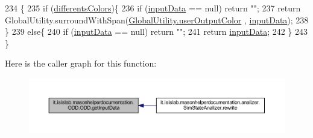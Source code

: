 \begin{DoxyCode}
234                                        \{
235         \textcolor{keywordflow}{if} (\hyperlink{classit_1_1isislab_1_1masonhelperdocumentation_1_1_o_d_d_1_1_o_d_d_ab09b176537cd5e168d67fc16112444dc}{differentsColors})\{
236             \textcolor{keywordflow}{if} (\hyperlink{classit_1_1isislab_1_1masonhelperdocumentation_1_1_o_d_d_1_1_o_d_d_a003e2cc245212d81de91896a8ce4f440}{inputData} == null) \textcolor{keywordflow}{return} \textcolor{stringliteral}{""};
237             \textcolor{keywordflow}{return} GlobalUtility.surroundWithSpan(\hyperlink{classit_1_1isislab_1_1masonhelperdocumentation_1_1analizer_1_1_global_utility_aec864cd710b27ece609c5a6093211ff4}{GlobalUtility.userOutputColor}
      , \hyperlink{classit_1_1isislab_1_1masonhelperdocumentation_1_1_o_d_d_1_1_o_d_d_a003e2cc245212d81de91896a8ce4f440}{inputData});
238         \}
239         \textcolor{keywordflow}{else}\{
240             \textcolor{keywordflow}{if} (\hyperlink{classit_1_1isislab_1_1masonhelperdocumentation_1_1_o_d_d_1_1_o_d_d_a003e2cc245212d81de91896a8ce4f440}{inputData} == null) \textcolor{keywordflow}{return} \textcolor{stringliteral}{""};
241             \textcolor{keywordflow}{return} \hyperlink{classit_1_1isislab_1_1masonhelperdocumentation_1_1_o_d_d_1_1_o_d_d_a003e2cc245212d81de91896a8ce4f440}{inputData};
242         \}
243     \}
\end{DoxyCode}


Here is the caller graph for this function\-:
\nopagebreak
\begin{figure}[H]
\begin{center}
\leavevmode
\includegraphics[width=350pt]{classit_1_1isislab_1_1masonhelperdocumentation_1_1_o_d_d_1_1_o_d_d_adf8e82ba7854afdc0790d3b3032b930c_icgraph}
\end{center}
\end{figure}


